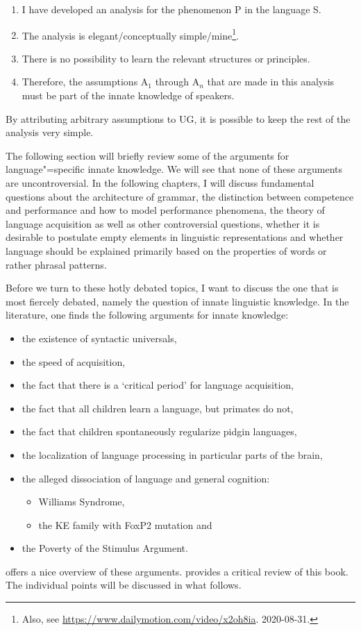 \begin{enumerate}
\item I have developed an analysis for the phenomenon P in the language S.
\item The analysis is elegant/conceptually simple/mine\footnote{%
    Also, see
    \url{https://www.dailymotion.com/video/x2oh8ia}. 2020-08-31.\nocite{Zappa86a}
}.
\item There is no possibility to learn the relevant structures or principles.
\item Therefore, the assumptions A$_1$ through A$_n$ that are made in this analysis must be part of the innate knowledge
of speakers.
\end{enumerate}
By attributing arbitrary assumptions to UG, it is possible to keep the rest of the analysis very
simple.

The following section will briefly review some of the arguments for language"=specific innate knowledge.
We will see that none of these arguments are uncontroversial. In the following chapters, I will discuss fundamental
questions about the architecture of grammar, the distinction between competence and performance and how to model
performance phenomena, the theory of language acquisition as well as other controversial questions, \eg 
whether it is desirable to postulate empty elements in linguistic representations and whether language should
be explained primarily based on the properties of words or rather phrasal patterns.

Before we turn to these hotly debated topics, I want to discuss the one that is most fiercely
debated, namely the question of innate linguistic knowledge. In the literature, one finds the
following arguments for innate knowledge:

\begin{itemize}
\item the existence of syntactic universals,
\item the speed of acquisition,
\item the fact that there is a `critical period' for language acquisition,
\item the fact that all children learn a language, but primates do not,
\item the fact that children spontaneously regularize pidgin languages, 
\item the localization of language processing in particular parts of the brain,
\item the alleged dissociation of language and general cognition:
\begin{itemize}
\item Williams Syndrome,
\item the KE family with FoxP2 mutation and
\end{itemize}
\item the Poverty of the Stimulus Argument.
\end{itemize}
\citet{Pinker94a} offers a nice overview of these arguments. \citet{Tomasello95a} provides a critical review of this book. The individual points will be discussed in what follows.

